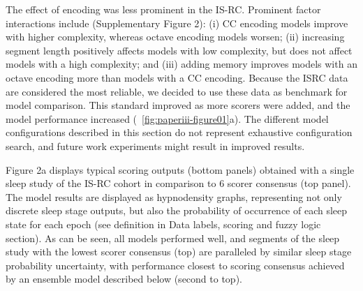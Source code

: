 The effect of encoding was less prominent in the IS-RC.
Prominent factor interactions include (Supplementary Figure 2): (i) CC encoding models improve with higher complexity, whereas octave encoding models worsen; (ii) increasing segment length positively affects models with low complexity, but does not affect models with a high complexity; and (iii) adding memory improves models with an octave encoding more than models with a CC encoding.
Because the ISRC data are considered the most reliable, we decided to use these data as benchmark for model comparison.
This standard improved as more scorers were added, and the model performance increased (~\cref{fig:paperiii-figure01}a).
The different model configurations described in this section do not represent exhaustive configuration search, and future work experiments might result in improved results.

Figure 2a displays typical scoring outputs (bottom panels) obtained with a single sleep study of the IS-RC cohort in comparison to 6 scorer consensus (top panel).
The model results are displayed as hypnodensity graphs, representing not only discrete sleep stage outputs, but also the probability of occurrence of each sleep state for each epoch (see definition in Data labels, scoring and fuzzy logic section).
As can be seen, all models performed well, and segments of the sleep study with the lowest scorer consensus (top) are paralleled by similar sleep stage probability uncertainty, with performance closest to scoring consensus achieved by an ensemble model described below (second to top).

